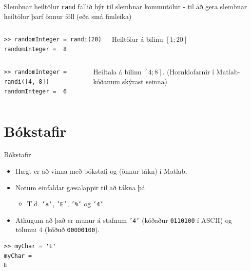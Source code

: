 \documentclass[handout]{beamer}
\begin{document}
\begin{frame}[fragile]{Slembnar heiltölur}
\texttt{rand} fallið býr til slembnar kommutölur - til að gera slembnar heiltölur þarf önnur föll (eða smá fimleika)
\begin{columns}
\begin{verbatim}
>> randomInteger = randi(20)
randomInteger =  8
\end{verbatim}
Heiltölur á bilinu $[1;20]$
\end{columns}

\begin{columns}
\begin{verbatim}
>> randomInteger = randi([4, 8])
randomInteger =  6
\end{verbatim}
Heiltala á bilinu $[4; 8]$. (Hornklofarnir í Matlab-kóðanum skýrast seinna)
\end{columns}
\end{frame}

\section{Bókstafir}

\begin{frame}[fragile]{Bókstafir}
\begin{itemize}
 \item Hægt er að vinna með bókstafi og (önnur tákn) í Matlab.
 \item Notum einfaldar gæsalappir til að tákna þá
 \begin{itemize}
  \item T.d. \texttt{'a'}, \texttt{'E'}, \texttt{'\%'} og \texttt{'4'}
 \end{itemize}
 \item Athugum að það er munur á stafnum \texttt{'4'} (kóðaður \texttt{0110100} í ASCII) og tölunni $4$ (kóðuð \texttt{00000100}).
\end{itemize}
\begin{verbatim}
>> myChar = 'E'
myChar =
E
\end{verbatim}
\end{frame}
\end{document}
